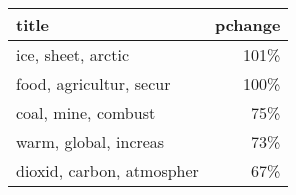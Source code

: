 \begin{tabular}{p{1.2cm}r}
\toprule
                     title &  pchange \\
\midrule
        ice, sheet, arctic &     101\% \\
   food, agricultur, secur &     100\% \\
       coal, mine, combust &      75\% \\
     warm, global, increas &      73\% \\
 dioxid, carbon, atmospher &      67\% \\
\bottomrule
\end{tabular}
